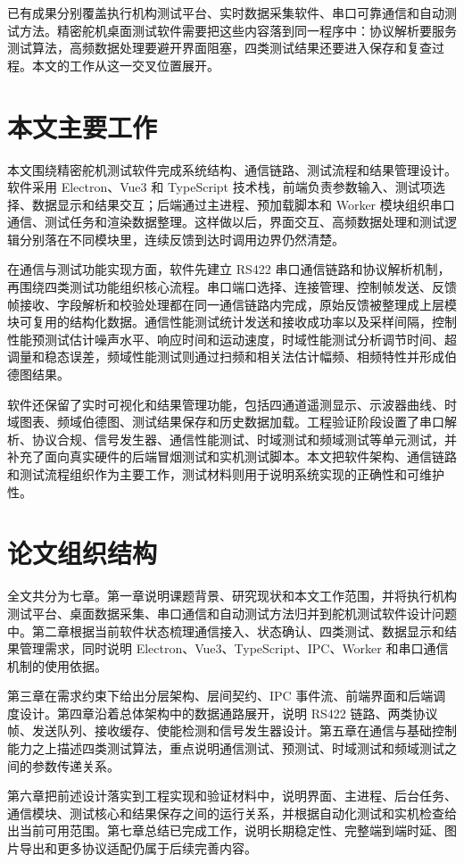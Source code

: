 已有成果分别覆盖执行机构测试平台、实时数据采集软件、串口可靠通信和自动测试方法。精密舵机桌面测试软件需要把这些内容落到同一程序中：协议解析要服务测试算法，高频数据处理要避开界面阻塞，四类测试结果还要进入保存和复查过程。本文的工作从这一交叉位置展开。

\section{本文主要工作}

本文围绕精密舵机测试软件完成系统结构、通信链路、测试流程和结果管理设计。软件采用 Electron、Vue3 和 TypeScript 技术栈，前端负责参数输入、测试项选择、数据显示和结果交互；后端通过主进程、预加载脚本和 Worker 模块组织串口通信、测试任务和渲染数据整理。这样做以后，界面交互、高频数据处理和测试逻辑分别落在不同模块里，连续反馈到达时调用边界仍然清楚。

在通信与测试功能实现方面，软件先建立 RS422 串口通信链路和协议解析机制，再围绕四类测试功能组织核心流程。串口端口选择、连接管理、控制帧发送、反馈帧接收、字段解析和校验处理都在同一通信链路内完成，原始反馈被整理成上层模块可复用的结构化数据。通信性能测试统计发送和接收成功率以及采样间隔，控制性能预测试估计噪声水平、响应时间和运动速度，时域性能测试分析调节时间、超调量和稳态误差，频域性能测试则通过扫频和相关法估计幅频、相频特性并形成伯德图结果。

软件还保留了实时可视化和结果管理功能，包括四通道遥测显示、示波器曲线、时域图表、频域伯德图、测试结果保存和历史数据加载。工程验证阶段设置了串口解析、协议合规、信号发生器、通信性能测试、时域测试和频域测试等单元测试，并补充了面向真实硬件的后端冒烟测试和实机测试脚本。本文把软件架构、通信链路和测试流程组织作为主要工作，测试材料则用于说明系统实现的正确性和可维护性。

\section{论文组织结构}

全文共分为七章。第一章说明课题背景、研究现状和本文工作范围，并将执行机构测试平台、桌面数据采集、串口通信和自动测试方法归并到舵机测试软件设计问题中。第二章根据当前软件状态梳理通信接入、状态确认、四类测试、数据显示和结果管理需求，同时说明 Electron、Vue3、TypeScript、IPC、Worker 和串口通信机制的使用依据。

第三章在需求约束下给出分层架构、层间契约、IPC 事件流、前端界面和后端调度设计。第四章沿着总体架构中的数据通路展开，说明 RS422 链路、两类协议帧、发送队列、接收缓存、使能检测和信号发生器设计。第五章在通信与基础控制能力之上描述四类测试算法，重点说明通信测试、预测试、时域测试和频域测试之间的参数传递关系。

第六章把前述设计落实到工程实现和验证材料中，说明界面、主进程、后台任务、通信模块、测试核心和结果保存之间的运行关系，并根据自动化测试和实机检查给出当前可用范围。第七章总结已完成工作，说明长期稳定性、完整端到端时延、图片导出和更多协议适配仍属于后续完善内容。
